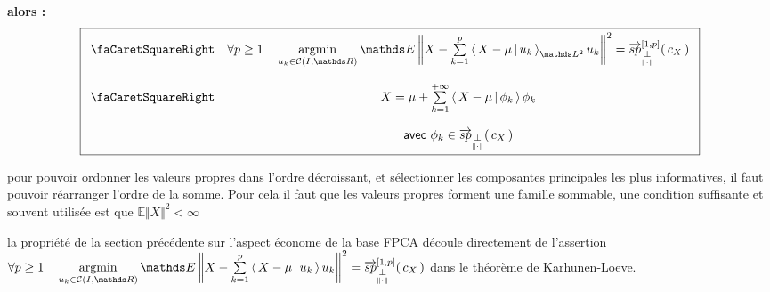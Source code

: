 \begin{minipage}{\textwidth}
\begin{thm}
    \textbf{alors :}
    $$
    \boxed{
    \begin{array}{cc}
        \textsf{\faCaretSquareRight} & 

            \forall p \geq 1 
            \quad
            \argmin\limits_{u_k \in \mathcal C(I, \mathds R)} \mathds E \left\Vert X - \sum\limits_{k=1}^p \prodscalselon {X - \mu} {u_k} {\mathds L^2} u_k \right\Vert^2 = \overrightarrow{sp}_{\orthonormal}^{[1,p]}( \, c_X \, )

        \\
        \\
        \textsf{\faCaretSquareRight} & X = \mu + \sum\limits_{k=1}^{+\infty} \prodscal {X - \mu} {\phi_k} \phi_k
        \\
        &
        \\
         &\textsf{avec } \phi_k \in \overrightarrow{sp}_{\orthonormal}( \, c_X \, )
    \end{array}
    }
    $$

    \label{thm:KL}
\end{thm}
\end{minipage}

\begin{rem}
    pour pouvoir ordonner les valeurs propres dans l'ordre décroissant, et sélectionner les composantes principales les plus informatives, il faut pouvoir réarranger l'ordre de la somme. Pour cela il faut que les valeurs propres forment une famille sommable, une condition suffisante et souvent utilisée est que $\mathds E \Vert X \Vert^2 < \infty$ 
\end{rem}

\begin{rem}
    la propriété de la section précédente sur l'aspect économe de la base FPCA découle directement de l'assertion $\forall p \geq 1 
    \quad
    \argmin\limits_{u_k \in \mathcal C(I, \mathds R)} \mathds E \left\Vert X - \sum\limits_{k=1}^p \prodscal {X - \mu} {u_k} u_k \right\Vert^2 = \overrightarrow{sp}_{\orthonormal}^{[1,p]}( \, c_X \, )$ dans le théorème de Karhunen-Loeve.
\end{rem}


